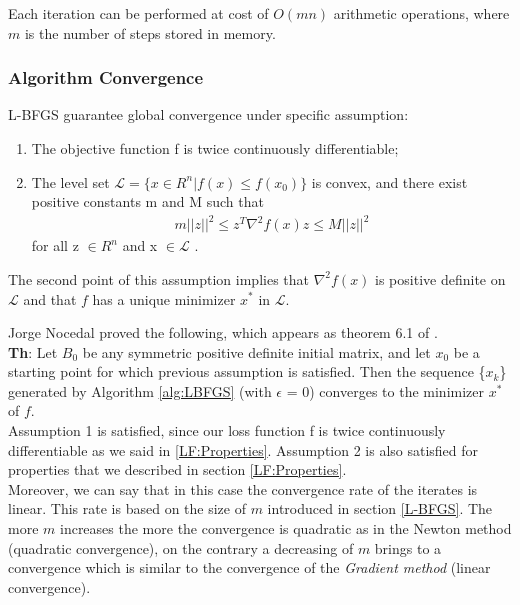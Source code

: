 Each iteration can be performed at cost of $O(mn)$ arithmetic operations, where $m$ is the number of steps stored in memory.

\subsubsection{Algorithm Convergence}

L-BFGS guarantee global convergence under specific assumption:
\begin{enumerate} \label{convergence:assumption}
	\item The objective function f is twice continuously differentiable;
	\item The level set $ \mathcal{L} = \{x \in R^n | \mathit{f(x)}  \leq  \mathit{f(x_0)}\}$ is convex, and there exist positive constants m and M such that 
	\begin{align}
	m||z||^2 \leq z^T \nabla^2f(x)z \leq M||z||^2
	\end{align}
	for all z $\in R^n$  and x $\in \mathcal{L}$ .
\end{enumerate}

The second point of this assumption implies that $\nabla^2f(x)$ is positive definite on $\mathcal{L}$ and that $\mathit{f}$ has a unique minimizer $x^*$ in $\mathcal{L}$.

Jorge Nocedal proved the following, which appears as theorem 6.1 of \cite{numerical}.
\\
\textbf{Th}: Let $B_0$ be any symmetric positive definite initial matrix, and let $x_0$ be a starting point for which previous assumption is satisfied. Then the sequence \{$x_k$\} generated by Algorithm \ref{alg:LBFGS} (with $\epsilon$ = 0) converges to the minimizer $x^*$ of $\mathit{f}$.
\\
Assumption 1 is satisfied, since our loss function f is twice continuously differentiable as we said in \ref{LF:Properties}. Assumption 2 is also satisfied for properties that we described in section \ref{LF:Properties}.
\\
Moreover, we can say that in this case the convergence rate of the iterates is linear. This rate is based on the size of $m$ introduced in section \ref{L-BFGS}. The more $m$ increases the more the convergence is quadratic as in the Newton method (quadratic convergence), on the contrary a decreasing of $m$ brings to a convergence which is similar to the convergence of the \textit{Gradient method} (linear convergence).







